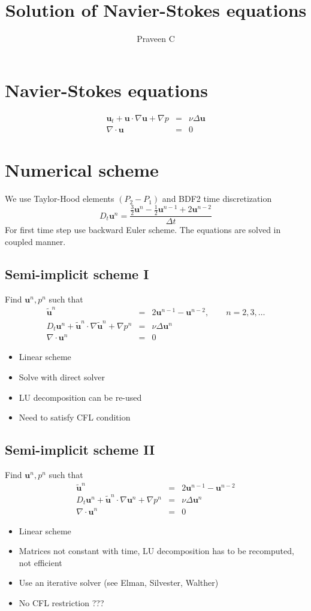 \documentclass[12pt, oneside]{article}   	%
\title{Solution of Navier-Stokes equations}
\author{Praveen C}
\newcommand{\vel}{\bm{u}}
\begin{document}
\maketitle

\section{Navier-Stokes equations}

\begin{eqnarray*}
\vel_t + \vel \cdot \nabla\vel + \nabla p &=& \nu \Delta\vel \\
\nabla\cdot\vel &=& 0
\end{eqnarray*}

\section{Numerical scheme}
We use Taylor-Hood elements $(P_2-P_1)$ and BDF2 time discretization
\[
D_t \vel^n = \frac{ \frac{3}{2}\vel^n - \frac{1}{2}\vel^{n-1} + 2 \vel^{n-2}}{\Delta t}
\]
For first time step use backward Euler scheme. The equations are solved in coupled manner.
\subsection{Semi-implicit scheme I}
Find $\vel^n, p^n$ such that
\begin{eqnarray*}
\tilde{\vel}^n &=& 2 \vel^{n-1} - \vel^{n-2}, \qquad n=2,3,\ldots \\
D_t \vel^n + \tilde{\vel}^n \cdot \nabla \tilde{\vel}^n + \nabla p^n &=& \nu \Delta\vel^n \\
\nabla\cdot\vel^n &=& 0
\end{eqnarray*}

\begin{itemize}
\item Linear scheme
\item Solve with direct solver
\item LU decomposition can be re-used
\item Need to satisfy CFL condition
\end{itemize}
\subsection{Semi-implicit scheme II}
Find $\vel^n, p^n$ such that
\begin{eqnarray*}
\tilde{\vel}^n &=& 2 \vel^{n-1} - \vel^{n-2} \\
D_t \vel^n + \tilde{\vel}^n \cdot \nabla \vel^n + \nabla p^n &=& \nu \Delta\vel^n \\
\nabla\cdot\vel^n &=& 0
\end{eqnarray*}

\begin{itemize}
\item Linear scheme
\item Matrices not constant with time, LU decomposition has to be recomputed, not efficient
\item Use an iterative solver (see Elman, Silvester, Walther)
\item No CFL restriction ???
\end{itemize}
\end{document}
